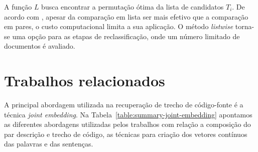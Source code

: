 A função $L$ busca encontrar a permutação ótima da lista de candidatos $T_{i}$. De acordo com \cite{guo-deep-look-into-neural-ranking-models:2019}, apesar da comparação em lista ser mais efetivo que a comparação em pares, o custo computacional limita a sua aplicação. O método \textit{listwise} torna-se uma opção para as etapas de reclassificação, onde um número limitado de documentos é avaliado. 

\section{Trabalhos relacionados}\label{sec:code-retrieval-trabalhos-relacionados}

A principal abordagem utilizada na recuperação de trecho de código-fonte é a técnica \textit{joint embedding}. Na Tabela~\ref{table:summary-joint-embedding} apontamos as diferentes abordagens utilizadas pelos trabalhos com relação a composição do par descrição e trecho de código, as técnicas para criação dos vetores contínuos das palavras e das sentenças.


